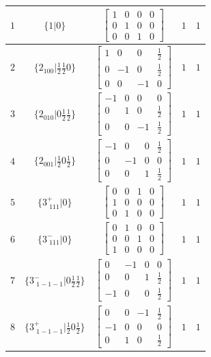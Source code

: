 \documentclass[fleqn,8pt]{jsarticle}
\begin{document}
\begin{longtable}{ccccc}
$ 1 $ & $ \{1|0\} $ & $ \begin{bmatrix} 1 & 0 & 0 & 0 \\ 0 & 1 & 0 & 0 \\ 0 & 0 & 1 & 0 \end{bmatrix} $ & $ 1 $ & $ 1 $ \\ \hline
$ 2 $ & $ \{2{}_{100}|\frac{1}{2} \frac{1}{2} 0\} $ & $ \begin{bmatrix} 1 & 0 & 0 & \frac{1}{2} \\ 0 & -1 & 0 & \frac{1}{2} \\ 0 & 0 & -1 & 0 \end{bmatrix} $ & $ 1 $ & $ 1 $ \\ \hline
$ 3 $ & $ \{2{}_{010}|0 \frac{1}{2} \frac{1}{2}\} $ & $ \begin{bmatrix} -1 & 0 & 0 & 0 \\ 0 & 1 & 0 & \frac{1}{2} \\ 0 & 0 & -1 & \frac{1}{2} \end{bmatrix} $ & $ 1 $ & $ 1 $ \\ \hline
$ 4 $ & $ \{2{}_{001}|\frac{1}{2} 0 \frac{1}{2}\} $ & $ \begin{bmatrix} -1 & 0 & 0 & \frac{1}{2} \\ 0 & -1 & 0 & 0 \\ 0 & 0 & 1 & \frac{1}{2} \end{bmatrix} $ & $ 1 $ & $ 1 $ \\ \hline
$ 5 $ & $ \{3^{+}_{\,\,111}|0\} $ & $ \begin{bmatrix} 0 & 0 & 1 & 0 \\ 1 & 0 & 0 & 0 \\ 0 & 1 & 0 & 0 \end{bmatrix} $ & $ 1 $ & $ 1 $ \\ \hline
$ 6 $ & $ \{3^{-}_{\,\,111}|0\} $ & $ \begin{bmatrix} 0 & 1 & 0 & 0 \\ 0 & 0 & 1 & 0 \\ 1 & 0 & 0 & 0 \end{bmatrix} $ & $ 1 $ & $ 1 $ \\ \hline
$ 7 $ & $ \{3^{-}_{\,\,1-1-1}|0 \frac{1}{2} \frac{1}{2}\} $ & $ \begin{bmatrix} 0 & -1 & 0 & 0 \\ 0 & 0 & 1 & \frac{1}{2} \\ -1 & 0 & 0 & \frac{1}{2} \end{bmatrix} $ & $ 1 $ & $ 1 $ \\ \hline
$ 8 $ & $ \{3^{+}_{\,\,1-1-1}|\frac{1}{2} 0 \frac{1}{2}\} $ & $ \begin{bmatrix} 0 & 0 & -1 & \frac{1}{2} \\ -1 & 0 & 0 & 0 \\ 0 & 1 & 0 & \frac{1}{2} \end{bmatrix} $ & $ 1 $ & $ 1 $ \\ \hline

\end{longtable}
\end{document}
